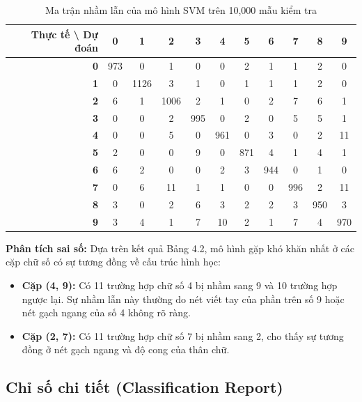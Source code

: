 \documentclass[../DoAn.tex]{subfiles}
\begin{document}
\begin{table}[H]
\centering
\small
\caption{Ma trận nhầm lẫn của mô hình SVM trên 10,000 mẫu kiểm tra}
\label{tab:svm_cm}
\begin{tabular}{r|cccccccccc}
\hline
\textbf{Thực tế \textbackslash{} Dự đoán} & \textbf{0} & \textbf{1} & \textbf{2} & \textbf{3} & \textbf{4} & \textbf{5} & \textbf{6} & \textbf{7} & \textbf{8} & \textbf{9} \\ \hline
\textbf{0} & 973 & 0   & 1   & 0   & 0   & 2   & 1   & 1   & 2   & 0   \\
\textbf{1} & 0   & 1126 & 3   & 1   & 0   & 1   & 1   & 1   & 2   & 0   \\
\textbf{2} & 6   & 1   & 1006 & 2   & 1   & 0   & 2   & 7   & 6   & 1   \\
\textbf{3} & 0   & 0   & 2   & 995 & 0   & 2   & 0   & 5   & 5   & 1   \\
\textbf{4} & 0   & 0   & 5   & 0   & 961 & 0   & 3   & 0   & 2   & 11  \\
\textbf{5} & 2   & 0   & 0   & 9   & 0   & 871 & 4   & 1   & 4   & 1   \\
\textbf{6} & 6   & 2   & 0   & 0   & 2   & 3   & 944 & 0   & 1   & 0   \\
\textbf{7} & 0   & 6   & 11  & 1   & 1   & 0   & 0   & 996 & 2   & 11  \\
\textbf{8} & 3   & 0   & 2   & 6   & 3   & 2   & 2   & 3   & 950 & 3   \\
\textbf{9} & 3   & 4   & 1   & 7   & 10  & 2   & 1   & 7   & 4   & 970 \\ \hline
\end{tabular}
\end{table}

\textbf{Phân tích sai số:} Dựa trên kết quả Bảng 4.2, mô hình gặp khó khăn nhất ở các cặp chữ số có sự tương đồng về cấu trúc hình học:
\begin{itemize}
    \item \textbf{Cặp (4, 9):} Có 11 trường hợp chữ số 4 bị nhầm sang 9 và 10 trường hợp ngược lại. Sự nhầm lẫn này thường do nét viết tay của phần trên số 9 hoặc nét gạch ngang của số 4 không rõ ràng.
    \item \textbf{Cặp (2, 7):} Có 11 trường hợp chữ số 7 bị nhầm sang 2, cho thấy sự tương đồng ở nét gạch ngang và độ cong của thân chữ.
\end{itemize}

\subsection{Chỉ số chi tiết (Classification Report)}
\end{document}
